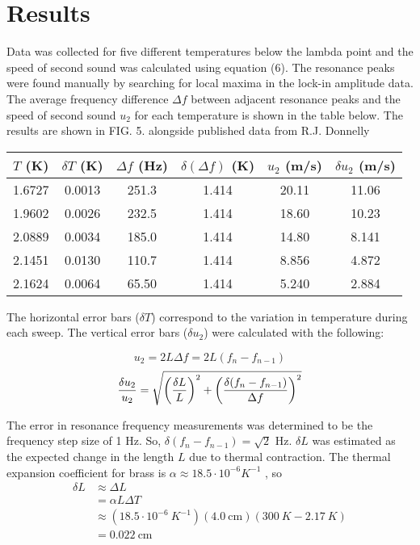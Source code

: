 \documentclass[prb,aps,twocolumn,showpacs,10pt]{revtex4-1}
\begin{document}
\section{Results}

Data was collected for five different temperatures below the lambda point and the speed of second sound was calculated using equation (6). The resonance peaks were found manually by searching for local maxima in the lock-in amplitude data. The average frequency difference $\Delta f$ between adjacent resonance peaks and the speed of second sound $u_2$ for each temperature is shown in the table below. The results are shown in FIG. 5. alongside published data from R.J. Donnelly \cite{donnelly.} 

\begin{center}
\begin{tabular}{|c|c|c|c|c|c|}
\hline
$T$ (K) & $\delta T$ (K) & $\Delta f$ (Hz) & $\delta(\Delta f)$ (K) & $u_2$ (m/s) & $\delta u_2$ (m/s)\\
\hline
\hline
1.6727&0.0013&251.3&1.414&20.11&11.06\\
\hline
1.9602&0.0026&232.5&1.414&18.60&10.23\\
\hline
2.0889&0.0034&185.0&1.414&14.80&8.141\\
\hline
2.1451&0.0130&110.7&1.414&8.856&4.872\\
\hline
2.1624&0.0064&65.50&1.414&5.240&2.884\\
\hline
\end{tabular}
\end{center}

The horizontal error bars ($\delta T$) correspond to the variation in temperature during each sweep. The vertical error bars ($\delta u_2$) were calculated with the following:

\begin{equation}
u_2 = 2 L \Delta f = 2 L (f_n-f_{n-1})
\end{equation}
\begin{equation}
\frac{\delta u_2}{u_2} = \sqrt{\left( \frac{\delta L }{L} \right)^2 + \left( \frac{\delta (f_n-f_{n-1}) }{\Delta f} \right)^2}\\ \\
\end{equation}


The error in resonance frequency measurements was determined to be the frequency step size of 1 Hz. So, $\delta (f_n-f_{n-1}) = \sqrt{2}$ Hz. $\delta L$ was estimated as the expected change in the length $L$ due to thermal contraction. The thermal expansion coefficient for brass \cite{toolbox} is $\alpha \approx 18.5 \cdot 10^{-6} K^{-1}$ , so
\begin{equation}
\begin{aligned}
\delta L &\approx \Delta L \\
&= \alpha L \Delta T \\
&\approx(18.5 \cdot 10^{-6}\  K^{-1})(4.0 \ \text{cm})(300 \ K - 2.17 \ K) \\
&= 0.022 \  \text{cm}
\end{aligned}
\end{equation}
\end{document}
